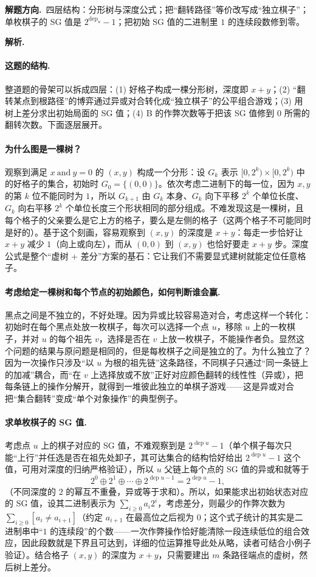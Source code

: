 \documentclass[UTF8,a4paper,11pt,oneside,openany,fontset=fandol]{ctexbook}
\theoremstyle{definition}
\newcommand{\dep}{\operatorname{dep}}
\newcommand{\iva}[1]{\left[#1\right]}
\newcommand{\sol}{\par\noindent\textbf{解析.}\ }
\newcommand{\hint}{\par\noindent\textbf{解题方向.}\ }
\begin{document}
\hint 四层结构：分形树与深度公式；把“翻转路径”等价改写成“独立棋子”；单枚棋子的 SG 值是 $2^{\dep_u}-1$；把初始 SG 值的二进制里 $1$ 的连续段数修到零。

\sol \paragraph{这题的结构.} 整道题的骨架可以拆成四层：(1) 好格子构成一棵分形树，深度即 $x+y$；(2) “翻转某点到根路径”的博弈通过异或对合转化成“独立棋子”的公平组合游戏；(3) 用树上差分求出初始局面的 SG 值；(4) B 的作弊次数等于把该 SG 值修到 $0$ 所需的翻转次数。下面逐层展开。

\paragraph{为什么图是一棵树？} 观察到满足 $x\ \mathrm{and}\ y=0$ 的 $(x,y)$ 构成一个分形：设 $G_k$ 表示 $[0,2^{k})\times[0,2^{k})$ 中的好格子的集合，初始时 $G_0=\{(0,0)\}$。依次考虑二进制下的每一位，因为 $x,y$ 的第 $k$ 位不能同时为 $1$，所以 $G_{k+1}$ 由 $G_k$ 本身、$G_k$ 向下平移 $2^{k}$ 个单位长度、$G_k$ 向右平移 $2^{k}$ 个单位长度三个形状相同的部分组成。不难发现这是一棵树，且每个格子的父亲要么是它上方的格子，要么是左侧的格子（这两个格子不可能同时是好的）。基于这个刻画，容易观察到 $(x,y)$ 的深度是 $x+y$：每走一步恰好让 $x+y$ 减少 $1$（向上或向左），而从 $(0,0)$ 到 $(x,y)$ 也恰好要走 $x+y$ 步。深度公式是整个“虚树 + 差分”方案的基石：它让我们不需要显式建树就能定位任意格子。

\paragraph{考虑给定一棵树和每个节点的初始颜色，如何判断谁会赢.} 黑点之间是不独立的，不好处理。因为异或比较容易造对合，考虑这样一个转化：初始时在每个黑点处放一枚棋子，每次可以选择一个点 $u$，移除 $u$ 上的一枚棋子，并对 $u$ 的每个祖先 $v$，选择是否在 $v$ 上放一枚棋子，不能操作者负。显然这个问题的结果与原问题是相同的，但是每枚棋子之间是独立的了。为什么独立了？因为一次操作只涉及“以 $u$ 为根的祖先链”这条路径，不同棋子只通过“同一条链上的加减”耦合，而“在 $v$ 上选择放或不放”正好对应颜色翻转的线性性（异或），把每条链上的操作分解开，就得到一堆彼此独立的单棋子游戏——这是异或对合把“集合翻转”变成“单个对象操作”的典型例子。

\paragraph{求单枚棋子的 SG 值.} 考虑点 $u$ 上的棋子对应的 SG 值，不难观察到是 $2^{\dep u}-1$（单个棋子每次只能“上行”并任选是否在祖先处卸子，其可达集合的结构恰好给出 $2^{\dep u}-1$ 这个值，可用对深度的归纳严格验证），所以 $u$ 父链上每个点的 SG 值的异或和就等于
\[
 2^{0}\oplus2^{1}\oplus\cdots\oplus2^{\dep u-1}=2^{\dep u}-1,
\]
（不同深度的 $2$ 的幂互不重叠，异或等于求和）。所以，如果能求出初始状态对应的 SG 值，设其二进制表示为 $\sum_{i\ge0}a_i2^{i}$，考虑差分，则最少的作弊次数为 $\sum_{i\ge0}\iva{a_i\ne a_{i+1}}$（约定 $a_{i+1}$ 在最高位之后视为 $0$；这个式子统计的其实是二进制串中“$1$ 的连续段”的个数——一次作弊操作恰好能清除一段连续低位的组合效应，因此段数就是下界且可达到，详细的位运算推导此处从略，读者可结合小例子验证）。结合格子 $(x,y)$ 的深度为 $x+y$，只需要建出 $m$ 条路径端点的虚树，然后树上差分。
\end{document}
